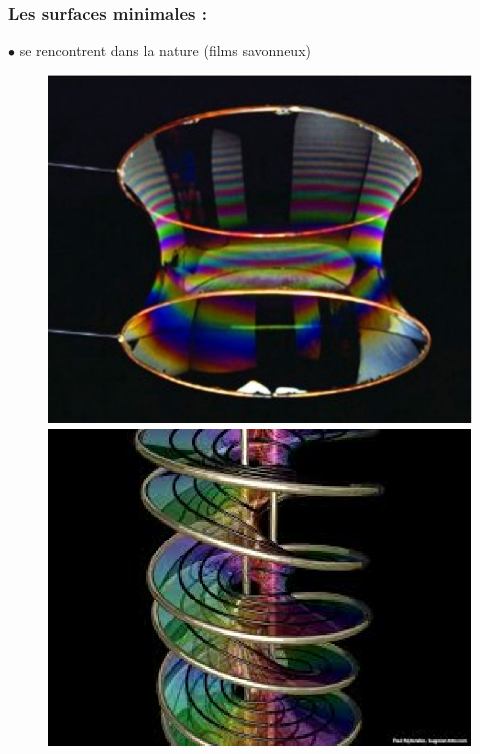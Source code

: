 \documentclass{beamer}
\begin{document}
\begin{frame}
\frametitle{Les surfaces minimales :}
$\bullet$ se rencontrent dans la nature (films savonneux)\\
\begin{figure}[h!]
  \begin{minipage}[b]{0.40\linewidth}
    \centering \includegraphics[scale=0.16]{savoncaten.eps}
 \end{minipage}
\begin{minipage}[b]{0.48\linewidth}   
 \centering \includegraphics[scale=0.4]{savonhelico.eps}
\end{minipage}
\end{figure}

\end{frame}
\end{document}
